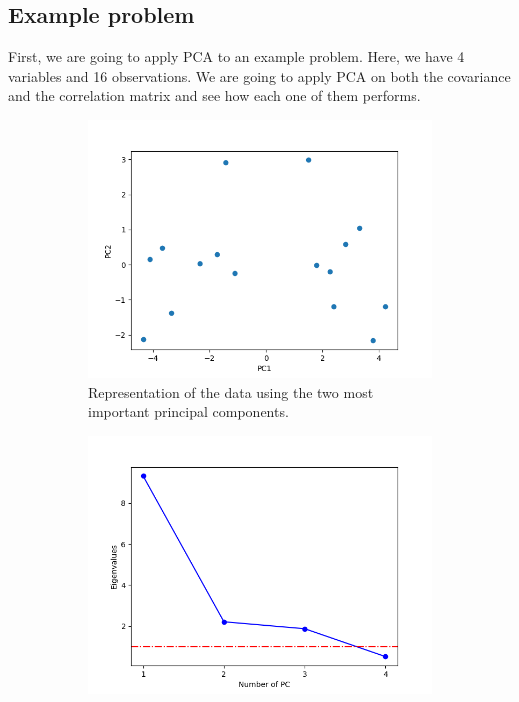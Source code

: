 \documentclass[11pt,a4paper]{article}
\begin{document}
\subsection{Example problem}

First, we are going to apply PCA to an example problem. Here, we have 4 variables and 16 observations. We
are going to apply PCA on both the covariance and the correlation matrix and see how each one of them performs.

\begin{figure}[H]
  \centering
  \begin{subfigure}[t]{.5\textwidth}
    \centering
    \includegraphics[scale=0.4]{img/pc_covariance}
    \caption{Representation of the data using the two most important principal components.}
  \end{subfigure}%
  \begin{subfigure}[t]{.5\textwidth}
    \centering
    \includegraphics[scale=0.4]{img/pc_covariance_kaiser}

\end{subfigure}
\end{figure}
\end{document}
